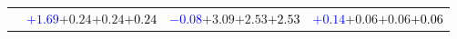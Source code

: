 \documentclass[compress]{beamer}
\begin{document}
\begin{frame}
\begin{tabular}{r | c | c | c}
          & \textcolor{blue}{$+1.69$}\hspace{0.1 cm}$+0.24$\hspace{0.1 cm}$+0.24$\hspace{0.1 cm}\textcolor{black}{$+0.24$} & \textcolor{blue}{$-0.08$}\hspace{0.1 cm}$+3.09$\hspace{0.1 cm}$+2.53$\hspace{0.1 cm}\textcolor{black}{$+2.53$} & \textcolor{blue}{$+0.14$}\hspace{0.1 cm}$+0.06$\hspace{0.1 cm}$+0.06$\hspace{0.1 cm}\textcolor{black}{$+0.06$} \\
\end{tabular}
\end{frame}
\end{document}
